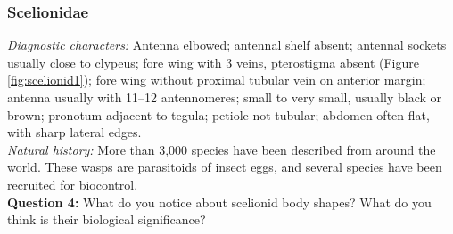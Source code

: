 \documentclass[letterpaper, 11pt]{article}
\begin{document}
\subsubsection{Scelionidae}
\noindent{}\textit{Diagnostic characters:} Antenna elbowed; antennal shelf absent; antennal sockets usually close to clypeus; fore wing with 3 veins, pterostigma absent (Figure \ref{fig:scelionid1}); fore wing without proximal tubular vein on anterior margin; antenna usually with 11--12 antennomeres; small to very small, usually black or brown; pronotum adjacent to tegula; petiole not tubular; abdomen often flat, with sharp lateral edges.\\

\noindent{}\textit{Natural history:} More than 3,000 species have been described from around the world. These wasps are parasitoids of insect eggs, and several species have been recruited for biocontrol. \\

\noindent\textbf{Question 4:} What do you notice about scelionid body shapes? What do you think is their biological significance?\vspace{2cm}
\end{document}
